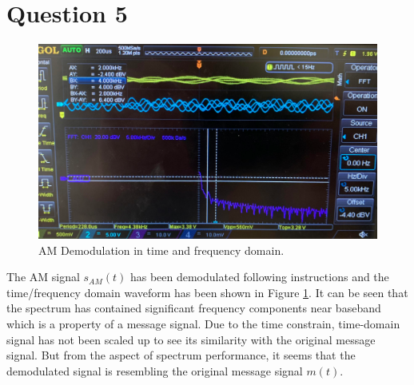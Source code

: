 \documentclass[11pt]{article}
\begin{document}
\section*{Question 5}
\begin{figure}[H]
    \centering
    \includegraphics[scale = 0.55]{Q5.PNG}
    \caption{\label{fig:q5}AM Demodulation in time and frequency domain.}
\end{figure}
The AM signal $s_{AM}(t)$ has been demodulated following instructions and the time/frequency domain waveform has been shown in Figure \ref{fig:q5}. It can be seen that the spectrum has contained significant frequency components near baseband which is a property of a message signal. Due to the time constrain, time-domain signal has not been scaled up to see its similarity with the original message signal. But from the aspect of spectrum performance, it seems that the demodulated signal is resembling the original message signal $m(t)$. 
\end{document}
